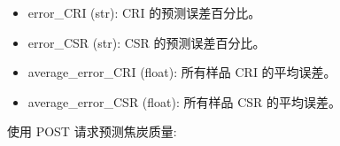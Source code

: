 \documentclass[a4paper,12pt,english]{sphinxmanual}
\begin{document}
\begin{fulllineitems}
\begin{description}
\begin{description}
\begin{itemize}
\item {} 
\sphinxAtStartPar
error\_CRI (str): CRI 的预测误差百分比。

\item {} 
\sphinxAtStartPar
error\_CSR (str): CSR 的预测误差百分比。

\item {} 
\sphinxAtStartPar
average\_error\_CRI (float): 所有样品 CRI 的平均误差。

\item {} 
\sphinxAtStartPar
average\_error\_CSR (float): 所有样品 CSR 的平均误差。

\end{itemize}

\end{description}

\sphinxAtStartPar
使用 POST 请求预测焦炭质量:

\begin{sphinxVerbatim}[commandchars=\\\{\}]
 
\PYG{p}{[}
         
         
         
         
         
         
\PYG{p}{]}


\end{sphinxVerbatim}
\end{description}
\end{fulllineitems}
\end{document}
